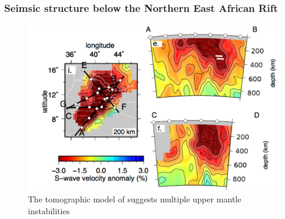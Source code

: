 \documentclass[aspectratio=169]{beamer}
\begin{document}
\begin{frame}
    \frametitle{Seimsic structure below the Northern East African Rift}
    \begin{figure}
        \vspace{-0.3cm}
        \includegraphics[height=0.7\paperheight]{./figures/chiara1.png}
        \caption{The tomographic model of \cite{civiero-etal-2016} suggests multiple upper mantle instabilities}
    \end{figure}
\end{frame}
\end{document}
